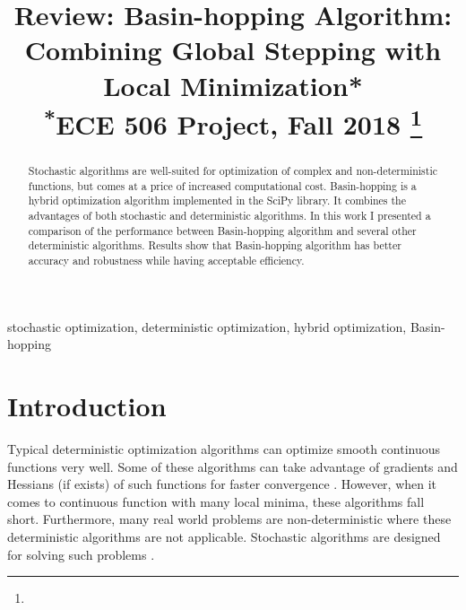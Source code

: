 \documentclass[conference]{IEEEtran}
\begin{document}
\title{Review: Basin-hopping Algorithm: Combining Global Stepping with Local Minimization*\\
{\footnotesize \textsuperscript{*}ECE 506 Project, Fall 2018}
\thanks{}
}

\author{
}

\maketitle

\begin{abstract}
Stochastic algorithms are well-suited for optimization of complex and non-deterministic functions, but comes at a price of increased computational cost. Basin-hopping is a hybrid optimization algorithm implemented in the SciPy library. It combines the advantages of both stochastic and deterministic algorithms. In this work I presented a comparison of the performance between Basin-hopping algorithm and several other deterministic algorithms. Results show that Basin-hopping algorithm has better accuracy and robustness while having acceptable efficiency.
\end{abstract}

\begin{IEEEkeywords}
stochastic optimization, deterministic optimization, hybrid optimization, Basin-hopping
\end{IEEEkeywords}

\section{Introduction}

Typical deterministic optimization algorithms can optimize smooth continuous functions very well. Some of these algorithms can take advantage of gradients and Hessians (if exists) of such functions for faster convergence \cite{b1}. However, when it comes to continuous function with many local minima, these algorithms fall short. Furthermore, many real world problems are non-deterministic where these deterministic algorithms are not applicable. Stochastic algorithms are designed for solving such problems \cite{b3}.
\end{document}
